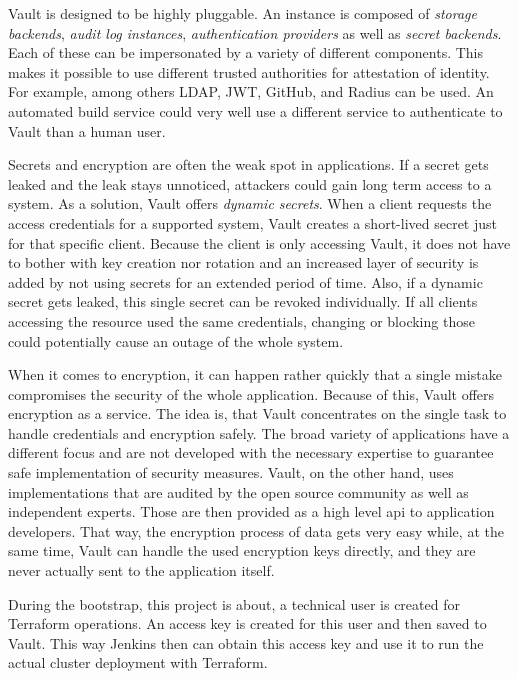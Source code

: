 Vault is designed to be highly pluggable.
An instance is composed of \emph{storage backends}, \emph{audit log instances}, \emph{authentication providers} as well as \emph{secret backends}.
Each of these can be impersonated by a variety of different components.
This makes it possible to use different trusted authorities for attestation of identity.
For example, among others LDAP, JWT, GitHub, and Radius can be used.
An automated build service could very well use a different service to authenticate to Vault than a human user.

Secrets and encryption are often the weak spot in applications.
If a secret gets leaked and the leak stays unnoticed, attackers could gain long term access to a system.
As a solution, Vault offers \emph{dynamic secrets}.
When a client requests the access credentials for a supported system, Vault creates a short-lived secret just for that specific client.
Because the client is only accessing Vault, it does not have to bother with key creation nor rotation and an increased layer of security is added by not using secrets for an extended period of time.
Also, if a dynamic secret gets leaked, this single secret can be revoked individually.
If all clients accessing the resource used the same credentials, changing or blocking those could potentially cause an outage of the whole system.

When it comes to encryption, it can happen rather quickly that a single mistake compromises the security of the whole application.
Because of this, Vault offers encryption as a service.
The idea is, that Vault concentrates on the single task to handle credentials and encryption safely.
The broad variety of applications have a different focus and are not developed with the necessary expertise to guarantee safe implementation of security measures.
Vault, on the other hand, uses implementations that are audited by the open source community as well as independent experts.
Those are then provided as a high level \ac{api} to application developers.
That way, the encryption process of data gets very easy while, at the same time, Vault can handle the used encryption keys directly, and they are never actually sent to the application itself. \cite{vaultproject.io}

During the bootstrap, this project is about, a technical user is created for Terraform operations.
An access key is created for this user and then saved to Vault.
This way Jenkins then can obtain this access key and use it to run the actual cluster deployment with Terraform.


